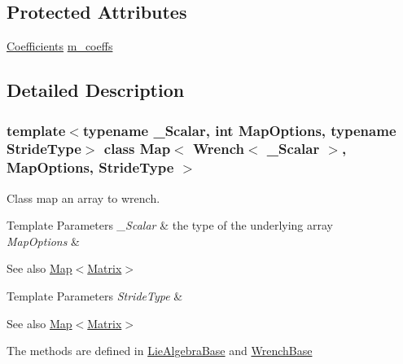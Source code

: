 \subsection*{Protected Attributes}
\begin{DoxyCompactItemize}
\item 
\hyperlink{class_map_3_01_wrench_3_01___scalar_01_4_00_01_map_options_00_01_stride_type_01_4_abfc1bf3f7dc1d3051325edad634172e8}{Coefficients} \hyperlink{class_map_3_01_wrench_3_01___scalar_01_4_00_01_map_options_00_01_stride_type_01_4_a77801912f5f6b222ed126ed4002a8edf}{m\+\_\+coeffs}
\end{DoxyCompactItemize}


\subsection{Detailed Description}
\subsubsection*{template$<$typename \+\_\+\+Scalar, int Map\+Options, typename Stride\+Type$>$\newline
class Map$<$ Wrench$<$ \+\_\+\+Scalar $>$, Map\+Options, Stride\+Type $>$}

Class map an array to wrench. 


\begin{DoxyTemplParams}{Template Parameters}
{\em \+\_\+\+Scalar} & the type of the underlying array \\
\hline
{\em Map\+Options} & \\
\hline
\end{DoxyTemplParams}
\begin{DoxySeeAlso}{See also}
\hyperlink{class_map_3_01_wrench_3_01___scalar_01_4_00_01_map_options_00_01_stride_type_01_4_ab778c7158f5d29d76672346ecfe4e3ea}{Map$<$\+Matrix$>$} 
\end{DoxySeeAlso}

\begin{DoxyTemplParams}{Template Parameters}
{\em Stride\+Type} & \\
\hline
\end{DoxyTemplParams}
\begin{DoxySeeAlso}{See also}
\hyperlink{class_map_3_01_wrench_3_01___scalar_01_4_00_01_map_options_00_01_stride_type_01_4_ab778c7158f5d29d76672346ecfe4e3ea}{Map$<$\+Matrix$>$}

The methods are defined in \hyperlink{class_lie_algebra_base}{Lie\+Algebra\+Base} and \hyperlink{class_wrench_base}{Wrench\+Base} 
\end{DoxySeeAlso}


